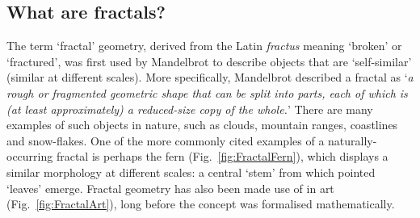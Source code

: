 \subsection{What are fractals?}

The term \lq fractal' geometry, derived from the Latin \emph{fractus} meaning \lq broken' or \lq fractured', was first used by Mandelbrot \cite{mandelbrot1982} to describe objects that are \lq self-similar' (similar at different scales). More specifically, Mandelbrot described a fractal as \lq \emph{a rough or fragmented geometric shape that can be split into parts, each of which is (at least approximately) a reduced-size copy of the whole.}' There are many examples of such objects in nature, such as clouds, mountain ranges, coastlines and snow-flakes. One of the more commonly cited examples of a naturally-occurring fractal is perhaps the fern (Fig.~\ref{fig:FractalFern}), which displays a similar morphology at different scales: a central \lq stem' from which pointed \lq leaves' emerge. Fractal geometry has also been made use of in art (Fig.~\ref{fig:FractalArt}), long before the concept was formalised mathematically.

